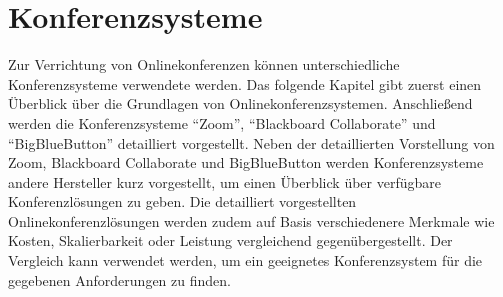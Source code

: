 \chapter{Konferenzsysteme} \label{ch:conference-systems}
Zur Verrichtung von Onlinekonferenzen können unterschiedliche Konferenzsysteme verwendete werden.
Das folgende Kapitel gibt zuerst einen Überblick über die Grundlagen von Onlinekonferenzsystemen.
Anschließend werden die Konferenzsysteme \enquote{Zoom}, \enquote{Blackboard Collaborate} und \enquote{BigBlueButton} detailliert vorgestellt.
Neben der detaillierten Vorstellung von Zoom, Blackboard Collaborate und  BigBlueButton werden Konferenzsysteme andere Hersteller kurz vorgestellt, um einen Überblick über verfügbare Konferenzlösungen zu geben.
Die detailliert vorgestellten Onlinekonferenzlösungen werden zudem auf Basis verschiedenere Merkmale wie Kosten, Skalierbarkeit oder Leistung vergleichend gegenübergestellt.
Der Vergleich kann verwendet werden, um ein geeignetes Konferenzsystem für die gegebenen Anforderungen zu finden.

